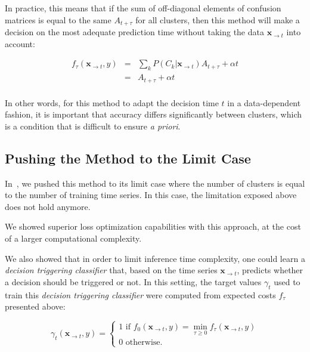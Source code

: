 In practice, this means that if the sum of off-diagonal elements of confusion
matrices is equal to the same $A_{t+\tau}$ for all clusters, then this method
will make a decision on the most adequate prediction time without taking the
data $\mathbf{x}_{\rightarrow t}$ into account:

\begin{eqnarray}
    f_\tau(\mathbf{x}_{\rightarrow t}, y) &=&
        \sum_k P(C_k | \mathbf{x}_{\rightarrow t})
        A_{t+\tau}
        + \alpha t \\
     &=&
        A_{t+\tau} + \alpha t \\
\end{eqnarray}

In other words, for this method to adapt the decision time $t$ in a
data-dependent fashion, it is important that accuracy differs
significantly between clusters, which is a condition that is difficult to ensure
\emph{a priori}.

\subsection{Pushing the Method to the Limit Case}

In~\cite{tavenard:halshs-01339007}, we pushed this method to its limit case
where the number of clusters is equal to the number of training time series.
In this case, the limitation exposed above does not hold anymore.

We showed superior loss optimization capabilities with this approach, at the
cost of a larger computational complexity.

We also showed that in order to limit inference time complexity, one could
learn a \emph{decision triggering classifier} that, based on the time series
$\mathbf{x}_{\rightarrow t}$, predicts whether a decision should be triggered
or not.
In this setting, the target values $\gamma_t$ used to train this
\emph{decision triggering classifier}
were computed from expected costs $f_\tau$ presented above:

\begin{equation}
    \gamma_t(\mathbf{x}_{\rightarrow t}, y) = \left\{
        \begin{array}{l}
            1 \text{ if } f_{0}(\mathbf{x}_{\rightarrow t}, y) =
                \min_{\tau \geq 0} f_{\tau}(\mathbf{x}_{\rightarrow t}, y) \\
            0 \text{ otherwise. }
        \end{array} \right.
\end{equation}

